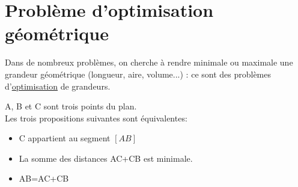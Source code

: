 \documentclass[french]{book}
\begin{document}
\section{Problème d'optimisation géométrique}

Dans de nombreux problèmes, on cherche à rendre minimale ou maximale une grandeur géométrique (longueur, aire, volume...) : ce sont des problèmes d'\underline{optimisation} de grandeurs.


\begin{prop}
A, B et C sont trois points du plan.\\
Les trois propositions suivantes sont équivalentes: 
\begin{itemize}
\item C appartient au segment $[AB]$
\item La somme des distances AC+CB est minimale.
\item AB=AC+CB
\end{itemize}
\end{prop}
\end{document}
